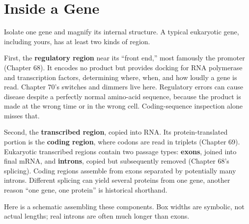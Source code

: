\section{Inside a Gene}

Isolate one gene and magnify its internal structure. A typical eukaryotic gene, including yours, has at least two kinds of region.

First, the \textbf{regulatory region} near its ``front end,'' most famously the promoter (Chapter 68). It encodes no product but provides docking for RNA polymerase and transcription factors, determining where, when, and how loudly a gene is read. Chapter 70's switches and dimmers live here. Regulatory errors can cause disease despite a perfectly normal amino-acid sequence, because the product is made at the wrong time or in the wrong cell. Coding-sequence inspection alone misses that.

Second, the \textbf{transcribed region}, copied into RNA. Its protein-translated portion is the \textbf{coding region}, where codons are read in triplets (Chapter 69). Eukaryotic transcribed regions contain two passage types: \textbf{exons}, joined into final mRNA, and \textbf{introns}, copied but subsequently removed (Chapter 68's splicing). Coding regions assemble from exons separated by potentially many introns. Different splicing can yield several proteins from one gene, another reason ``one gene, one protein'' is historical shorthand.

Here is a schematic assembling these components. Box widths are symbolic, not actual lengths; real introns are often much longer than exons.

\begin{center}
\end{center}

